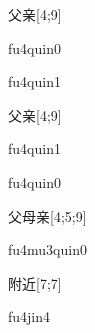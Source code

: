 \begin{verbete}[fu4qin0]{父亲}[4;9]
\begin{pronuncia}{fu4quin0}
\end{pronuncia}
\begin{pronuncia}{fu4quin1}
\end{pronuncia}
\end{verbete}

\begin{verbete}[fu4qin1]{父亲}[4;9]
\begin{pronuncia}{fu4quin1}
\end{pronuncia}
\begin{pronuncia}{fu4quin0}
\end{pronuncia}
\end{verbete}

\begin{verbete}[fu4mu3qin0]{父母亲}[4;5;9]
\begin{pronuncia}{fu4mu3quin0}
\end{pronuncia}
\end{verbete}

\begin{verbete}[fu4jin4]{附近}[7;7]
\begin{pronuncia}{fu4jin4}
\end{pronuncia}
\end{verbete}

